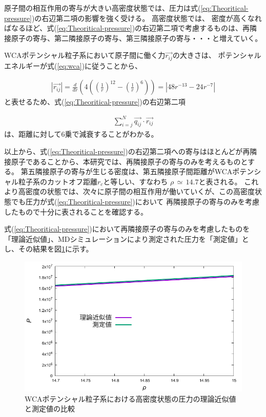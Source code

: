 \documentclass[titlepage]{jsreport}
\begin{document}
{{{原子間の相互作用の寄与が大きい高密度状態では、圧力は式(\ref{eq:Theoritical-pressure})の右辺第二項の影響を強く受ける。
高密度状態では、
密度が高くなればなるほど、式(\ref{eq:Theoritical-pressure})の右辺第二項で考慮するものは、再隣接原子の寄与、第二隣接原子の寄与、第三隣接原子の寄与・・・と増えていく。

WCAポテンシャル粒子系において原子間に働く力$\vec{r_{ij}}$の大きさは、
ポテンシャルエネルギーが式(\ref{eq:wca})に従うことから、

\large
\begin{eqnarray}
    | {\vec{r_{ij}}} |=\frac{d}{dr}\left(4\left(\left(\frac{1}{r}\right)^{12}-\left(\frac{1}{r}\right)^6\right)\right)=| 48r^{-13}-24r^{-7}| \nonumber
\end{eqnarray}
\normalsize
と表せるため、式(\ref{eq:Theoritical-pressure})の右辺第二項

\large
\begin{eqnarray}
    \sum_{i=j}^N\vec{q_{ij}} \cdot \vec{r_{ij}} \nonumber
\end{eqnarray}
\normalsize
は、距離に対して6乗で減衰することがわかる。

以上から、式(\ref{eq:Theoritical-pressure})の右辺第二項への寄与はほとんどが再隣接原子であることから、本研究では、再隣接原子の寄与のみを考えるものとする。
第五隣接原子の寄与が生じる密度は、第五隣接原子間距離がWCAポテンシャル粒子系のカットオフ距離$r_c$と等しい、すなわち
$\rho\,{\simeq}\,14.7$と表される。
これより高密度の状態では、次々に原子間の相互作用が働いていくが、この高密度状態でも圧力が式(\ref{eq:Theoritical-pressure})において
再隣接原子の寄与のみを考慮したもので十分に表されることを確認する。

式(\ref{eq:Theoritical-pressure})において再隣接原子の寄与のみを考慮したものを「理論近似値」、MDシミュレーションにより測定された圧力を「測定値」とし、その結果を図\ref{fig:highden_compare:den-pre}に示す。

\begin{figure}[htbp]
    \begin{center}
        \includegraphics[width=14cm]{fig/highden_compare:den-pre.pdf}
    \end{center}
    \caption{WCAポテンシャル粒子系における高密度状態の圧力の理論近似値と測定値の比較}
    \label{fig:highden_compare:den-pre}
\end{figure}


}}}
\end{document}
